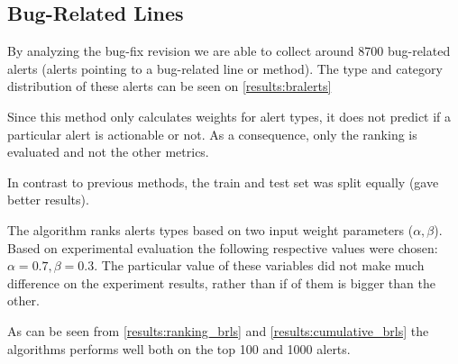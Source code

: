 \subsection{Bug-Related Lines}

By analyzing the bug-fix revision we are able to collect around 8700 bug-related alerts (alerts pointing to a bug-related line or method). The type and category distribution of these alerts can be seen on \cref{results:bralerts}

Since this method only calculates weights for alert types, it does not predict if a particular alert is actionable or not. As a consequence, only the ranking is evaluated and not the other metrics.

In contrast to previous methods, the train and test set was split equally (gave better results).

The algorithm ranks alerts types based on two input weight parameters ($\alpha,\beta$). Based on experimental evaluation the following respective values were chosen: $\alpha=0.7, 
\beta=0.3$. The particular value of these variables did not make much difference on the experiment results, rather than if of them is bigger than the other.

As can be seen from \cref{results:ranking_brls} and \cref{results:cumulative_brls} the algorithms performs well both on the top 100 and 1000 alerts.


